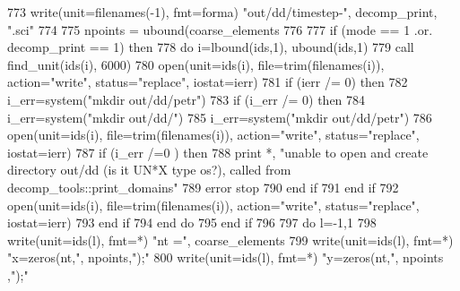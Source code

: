 \begin{DoxyCode}
773       \textcolor{keyword}{write}(unit=filenames(-1), fmt=forma) \textcolor{stringliteral}{"out/dd/timestep-"}, decomp\_print\textcolor{comment}{, }\textcolor{stringliteral}{".sci"}\textcolor{comment}{ }
774 \textcolor{comment}{}
775 \textcolor{comment}{      npoints = ubound(coarse_elements%
776 \textcolor{comment}{      }
777 \textcolor{comment}{      }\textcolor{keywordflow}{if} (mode == 1 .or. decomp\_print == 1) \textcolor{keywordflow}{then}
778         \textcolor{keywordflow}{do} i=lbound(ids,1), ubound(ids,1)
779           \textcolor{keyword}{call }find_unit(ids(i), 6000)
780           \textcolor{keyword}{open}(unit=ids(i), file=trim(filenames(i)), action=\textcolor{stringliteral}{"write"}, status=\textcolor{stringliteral}{"replace"}\textcolor{comment}{, iostat=ierr)}
781 \textcolor{comment}{          }\textcolor{keywordflow}{if} (ierr /= 0) \textcolor{keywordflow}{then}
782             i\_err=system(\textcolor{stringliteral}{"mkdir out/dd/petr"}) 
783             \textcolor{keywordflow}{if} (i\_err /= 0) \textcolor{keywordflow}{then}
784               i\_err=system(\textcolor{stringliteral}{"mkdir out/dd/"})
785               i\_err=system(\textcolor{stringliteral}{"mkdir out/dd/petr"})
786               \textcolor{keyword}{open}(unit=ids(i), file=trim(filenames(i)), action=\textcolor{stringliteral}{"write"}, status\textcolor{comment}{=}\textcolor{stringliteral}{"replace"}\textcolor{comment}{, iostat=ierr)}
787 \textcolor{comment}{              }\textcolor{keywordflow}{if} (i\_err /=0 ) \textcolor{keywordflow}{then}
788                 print *, \textcolor{stringliteral}{"unable to open and create directory out/dd (is it UN*X type os?), called  from
       decomp\_tools::print\_domains"}
789                 error stop
790 \textcolor{keywordflow}{              end if}
791 \textcolor{keywordflow}{            end if}
792             \textcolor{keyword}{open}(unit=ids(i), file=trim(filenames(i)), action=\textcolor{stringliteral}{"write"}, status=\textcolor{stringliteral}{"replace"}\textcolor{comment}{, iostat=ierr)}
793 \textcolor{comment}{}\textcolor{keywordflow}{          end if}
794 \textcolor{keywordflow}{        end do}  
795 \textcolor{keywordflow}{      end if}
796 
797      \textcolor{keywordflow}{do} l=-1,1    
798         \textcolor{keyword}{write}(unit=ids(l), fmt=*) \textcolor{stringliteral}{"nt ="}, coarse_elements%
799         \textcolor{keyword}{write}(unit=ids(l), fmt=*) \textcolor{stringliteral}{"x=zeros(nt,"}, npoints,\textcolor{stringliteral}{");"}
800         \textcolor{keyword}{write}(unit=ids(l), fmt=*) \textcolor{stringliteral}{"y=zeros(nt,"}, npoints ,\textcolor{stringliteral}{");"}
}
\end{DoxyCode}
